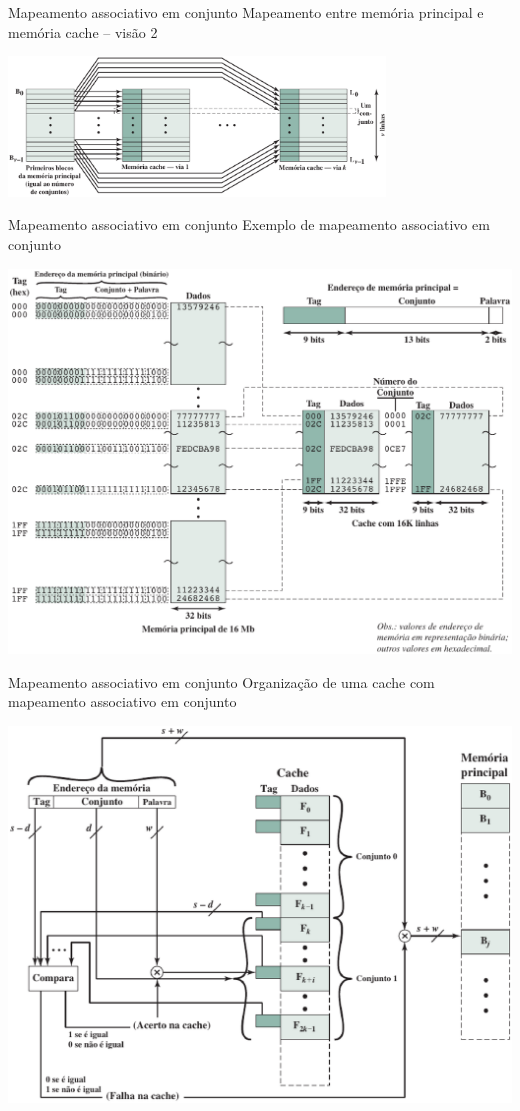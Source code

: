 \begin{slide}{Mapeamento associativo em conjunto}
	Mapeamento entre memória principal e memória cache -- visão 2
	\begin{center}
		\includegraphics[width=0.75\textwidth]{figs/associativo-conj-02}
	\end{center}
\end{slide}

\begin{slide}{Mapeamento associativo em conjunto}
	Exemplo de mapeamento associativo em conjunto
	\begin{center}
		\includegraphics[height=0.5\textwidth]{figs/exemplo-associativo-conj}
	\end{center}
\end{slide}

\begin{slide}{Mapeamento associativo em conjunto}
	Organização de uma cache com mapeamento associativo em conjunto
	\begin{center}
		\includegraphics[height=0.5\textwidth]{figs/organizacao-associativo-conj}
	\end{center}
\end{slide}

